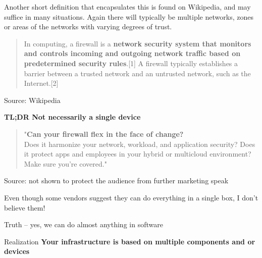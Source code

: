 \documentclass[Screen16to9,17pt]{foils}
\begin{document}

Another short definition that encapsulates this is found on Wikipedia, and may suffice in many situations. Again there will typically be multiple networks, zones or areas of the networks with varying degrees of trust.
\begin{quote}
In computing, a firewall is a {\bf network security system that monitors and controls incoming and outgoing network traffic based on predetermined security rules}.[1] A firewall typically establishes a barrier between a trusted network and an untrusted network, such as the Internet.[2]
\end{quote}
Source: Wikipedia

{\bf TL;DR Not necessarily a single device}






\begin{quote}
"{\bf Can your firewall flex in the face of change?}\\
Does it harmonize your network, workload, and application security? Does it protect apps and employees in your hybrid or multicloud environment? Make sure you're covered."
\end{quote}
Source: not shown to protect the audience from further marketing speak






\begin{list2}
\item Even though some vendors suggest they can do everything in a single box, I don't believe them!
\item Truth -- yes, we can do almost anything in software
\item Realization {\bf Your infrastructure is based on multiple components and or devices}
\end{list2}


\end{document}
